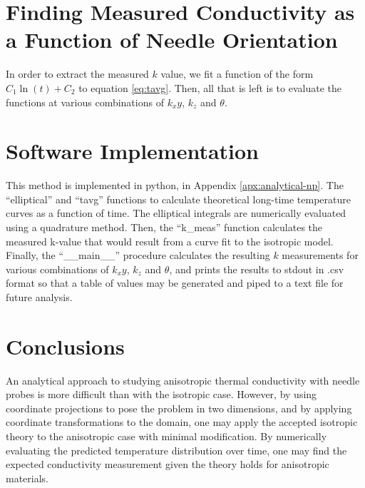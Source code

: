 \section{Finding Measured Conductivity as a Function of Needle Orientation}

In order to extract the measured \(k\) value, we fit a function of the form
\(C_1 \ln(t) + C_2\) to equation \ref{eq:tavg}. Then, all that is left is to evaluate the functions at various combinations of
\(k_xy\), \(k_z\) and \(\theta\).

\section{Software Implementation}

This method is implemented in python, in Appendix \ref{apx:analytical-np}. The ``elliptical'' and ``tavg'' functions to calculate theoretical long-time temperature curves as a function of time. The elliptical integrals are numerically evaluated using a quadrature method.  Then, the ``k\_meas'' function calculates the measured k-value that would result from a curve fit to the isotropic model. Finally, the ``\_\_main\_\_'' procedure calculates the resulting \(k\) measurements for various combinations of \(k_xy\), \(k_z\) and \(\theta\), and prints the results to stdout in .csv format so that a table of values may be generated and piped to a text file for future analysis.

\section{Conclusions}
\label{sec:analytical-np:conclusion}

An analytical approach to studying anisotropic thermal conductivity with needle
probes is more difficult than with the isotropic case. However, by using
coordinate projections to pose the problem in two dimensions, and by applying
coordinate transformations to the domain, one may apply the accepted isotropic
theory to the anisotropic case with minimal modification.  By numerically
evaluating the predicted temperature distribution over time, one may find the
expected conductivity measurement given the theory holds for anisotropic
materials.

